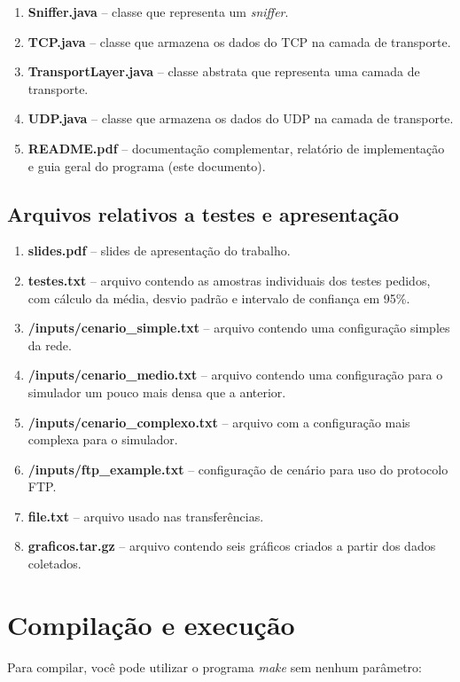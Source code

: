\documentclass[11pt]{article}
\begin{document}
\begin{enumerate}
\item \textbf{Sniffer.java} -- classe que representa um \textit{sniffer}.
\item \textbf{TCP.java} -- classe que armazena os dados do TCP na camada de transporte.
\item \textbf{TransportLayer.java} -- classe abstrata que representa uma camada de transporte.
\item \textbf{UDP.java} -- classe que armazena os dados do UDP na camada de transporte.
\item \textbf{README.pdf} -- documentação complementar, relatório de implementação e guia geral do programa (este documento).
\end{enumerate}

\subsection{Arquivos relativos a testes e apresentação}
\begin{enumerate}
	\item \textbf{slides.pdf} -- slides de apresentação do trabalho.
	\item \textbf{testes.txt} -- arquivo contendo as amostras individuais dos testes pedidos, com cálculo da média, desvio padrão e intervalo de confiança em 95\%.
	\item \textbf{/inputs/cenario\_simple.txt} -- arquivo contendo uma configuração simples da rede.
	\item \textbf{/inputs/cenario\_medio.txt} -- arquivo contendo uma configuração para o simulador um pouco mais densa que a anterior.
	\item \textbf{/inputs/cenario\_complexo.txt} -- arquivo com a configuração mais complexa para o simulador.
	\item \textbf{/inputs/ftp\_example.txt} -- configuração de cenário para uso do protocolo FTP.
	\item \textbf{file.txt} -- arquivo usado nas transferências.
	\item \textbf{graficos.tar.gz} -- arquivo contendo seis gráficos criados a partir dos dados coletados.\\
\end{enumerate}

\section{Compilação e execução}
Para compilar, você pode utilizar o programa \textit{make} sem nenhum parâmetro:
\end{document}
